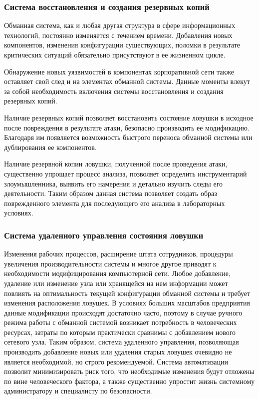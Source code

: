 \subsubsection{Система восстановления и создания резервных копий}\hspace*{\fill}

Обманная система, как и любая другая структура в сфере информационных технологий, постоянно изменяется с течением времени. Добавления новых компонентов, изменения конфигурации существующих, поломки в результате критических ситуаций обязательно присутствуют в ее жизненном цикле.

Обнаружение новых уязвимостей в компонентах корпоративной сети также оставляет свой след и на элементах обманной системы. Данные моменты влекут за собой необходимость включения системы восстановления и создания резервных копий. 

Наличие резервных копий позволяет восстановить состояние ловушки в исходное после повреждения в результате атаки, безопасно производить ее модификацию. Благодаря им появляется возможность быстрого переноса обманной системы или дублирования ее компонентов.

Наличие резервной копии ловушки, полученной после проведения атаки, существенно упрощает процесс анализа, позволяет определить инструментарий злоумышленника, выявить его намерения и детально изучить следы его деятельности. Таким образом данная система позволяет создать образ поврежденного элемента для последующего его анализа в лабораторных условиях.

\subsubsection{Система удаленного управления состояния ловушки}\hspace*{\fill}

Изменения рабочих процессов, расширение штата сотрудников, процедуры увеличения производительности системы и многое другое приводят к необходимости модифицирования компьютерной сети. Любое добавление, удаление или изменение узла или хранящейся на нем информации может повлиять на оптимальность текущей конфигурации обманной системы и требует изменения расположения ловушек. В условиях больших масштабов предприятия данные модификации происходят достаточно часто, поэтому в случае ручного режима работы с обманной системой возникает потребность в человеческих ресурсах, затраты по которым практически сравнимы с добавлением нового сетевого узла. Таким образом, система удаленного управления, позволяющая производить добавление новых или удаления старых ловушек очевидно не является необходимой, но строго рекомендуемой. Система автоматизации позволит минимизировать риск того, что необходимые изменения будут отложены по вине человеческого фактора, а также существенно упростит жизнь системному администратору и специалисту по безопасности.


